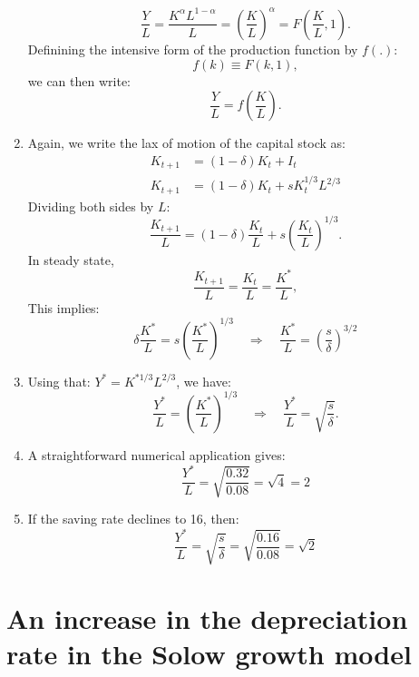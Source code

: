 \documentclass[]{book}
\begin{document}
\begin{enumerate}
  \[\frac{Y}{L}=\frac{K^\alpha L^{1-\alpha}}{L} = \left(\frac{K}{L}\right)^\alpha = F\left(\frac{K}{L}, 1\right).\]
  Definining the intensive form of the production function by \(f(.)\):
  \[f(k) \equiv F(k, 1),\] we can then write:
  \[\frac{Y}{L}=f\left(\frac{K}{L}\right).\]
\item
  Again, we write the lax of motion of the capital stock as: \[
  \begin{aligned}
  K_{t+1}&=(1-\delta)K_{t}+I_{t}\\
  K_{t+1}&=(1-\delta)K_{t}+sK_{t}^{1/3}L^{2/3}
  \end{aligned}
  \] Dividing both sides by \(L\):
  \[\frac{K_{t+1}}{L}=(1-\delta)\frac{K_{t}}{L}+s\left(\frac{K_{t}}{L}\right)^{1/3}.\]
  In steady state,
  \[\frac{K_{t+1}}{L}=\frac{K_{t}}{L}=\frac{K^{*}}{L},\] This implies:
  \[\delta\frac{K^{*}}{L}=s\left(\frac{K^{*}}{L}\right)^{1/3} \quad \Rightarrow \quad \boxed{\frac{K^{*}}{L}=\left(\frac{s}{\delta}\right)^{3/2}}\]
\item
  Using that: \(Y^{*}=K^{*1/3}L^{2/3}\), we have:
  \[\frac{Y^{*}}{L}=\left(\frac{K^{*}}{L}\right)^{1/3}\quad\Rightarrow\quad\boxed{\frac{Y^{*}}{L}=\sqrt{\frac{s}{\delta}}}.\]
\item
  A straightforward numerical application gives:
  \[\frac{Y^{*}}{L}=\sqrt{\frac{0.32}{0.08}}=\sqrt{4}=2\]
\item
  If the saving rate declines to 16, then:
  \[\frac{Y^{*}}{L}=\sqrt{\frac{s}{\delta}}=\sqrt{\frac{0.16}{0.08}}=\sqrt{2}\]
\end{enumerate}

\section{An increase in the depreciation rate in the Solow growth
model}\label{an-increase-in-the-depreciation-rate-in-the-solow-growth-model}
\end{document}
